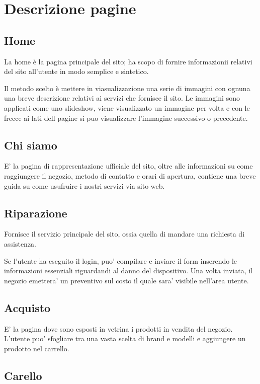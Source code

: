 \section{Descrizione pagine}

\subsection{Home}

La home è la pagina principale del sito; ha scopo di fornire informazionii relativi del sito
all'utente in modo semplice e sintetico.

Il metodo scelto è mettere in viasualizzazione una serie di immagini con ognuna una breve
descrizione relativi ai servizi che fornisce il sito. Le immagini sono applicati come uno slideshow,
viene visualizzato un immagine per volta e con le frecce ai lati dell pagine si puo visualizzare l'immagine
successivo o precedente.

\subsection{Chi siamo}

E' la pagina di rappresentazione ufficiale del sito, oltre alle informazioni su come raggiungere
il negozio, metodo di contatto e orari di apertura, contiene una breve guida su come 
usufruire i nostri servizi via sito web.

\subsection{Riparazione}

Fornisce il servizio principale del sito, ossia quella di mandare una richiesta di assistenza.

Se l'utente ha eseguito il login, puo' compilare e inviare il form inserendo le informazioni essenziali riguardandi
al danno del dispositivo. Una volta inviata, il negozio emettera' un preventivo sul costo il quale sara' visibile nell'area
utente.

\subsection{Acquisto}

E' la pagina dove sono esposti in vetrina i prodotti in vendita del negozio. L'utente puo' 
sfogliare tra una vasta scelta di brand e modelli e aggiungere un prodotto nel carrello.

\subsection{Carello}

